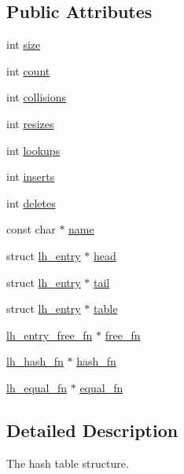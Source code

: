 \subsection*{Public Attributes}
\begin{DoxyCompactItemize}
\item 
int \hyperlink{structlh__table_ae251575ec2935bcb0e0589ca8e243839}{size}
\item 
int \hyperlink{structlh__table_aa172ed8fe205367b54e0e2cdf9ea8c6c}{count}
\item 
int \hyperlink{structlh__table_a9458e41d842ce40cd37dc13458ced133}{collisions}
\item 
int \hyperlink{structlh__table_ab4cde49bd9ce7a07daaf99af34ddb67e}{resizes}
\item 
int \hyperlink{structlh__table_afd0385c645413d26e682f725a6f52164}{lookups}
\item 
int \hyperlink{structlh__table_afd64becd0d2cfbc91a4c9c9a117498b9}{inserts}
\item 
int \hyperlink{structlh__table_a8348bdd7e61c8d72b402f6a152013fbf}{deletes}
\item 
const char $\ast$ \hyperlink{structlh__table_aebf4001cde3746ec8025c1d87d4e6279}{name}
\item 
struct \hyperlink{structlh__entry}{lh\+\_\+entry} $\ast$ \hyperlink{structlh__table_aa7d986a3b12a9fa47e349713794c30fb}{head}
\item 
struct \hyperlink{structlh__entry}{lh\+\_\+entry} $\ast$ \hyperlink{structlh__table_a479895e45db2bdf9bf5d173fa4b7e277}{tail}
\item 
struct \hyperlink{structlh__entry}{lh\+\_\+entry} $\ast$ \hyperlink{structlh__table_a4fd9c5aba38791b26ab0ec614a5caf8f}{table}
\item 
\hyperlink{linkhash_8h_a0c6811f660b93857aafdbfdf80d9696b}{lh\+\_\+entry\+\_\+free\+\_\+fn} $\ast$ \hyperlink{structlh__table_a30ea5903f4f8126abd6aa489ffe14737}{free\+\_\+fn}
\item 
\hyperlink{linkhash_8h_a1780449146b716ad5e6ed0a0207d0417}{lh\+\_\+hash\+\_\+fn} $\ast$ \hyperlink{structlh__table_a1488d1a4a320b1a9bb2f441859544be1}{hash\+\_\+fn}
\item 
\hyperlink{linkhash_8h_abcbf0e4849fb0c6279827ac3b66d15c3}{lh\+\_\+equal\+\_\+fn} $\ast$ \hyperlink{structlh__table_aa646c287a6a46e09da6c7457c981a359}{equal\+\_\+fn}
\end{DoxyCompactItemize}


\subsection{Detailed Description}
The hash table structure. 

